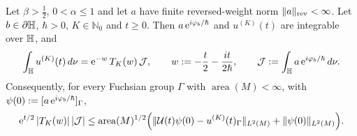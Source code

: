 \begin{proposition}\label{prop:mean}
Let $\beta>\tfrac12$, $0<\alpha\le1$ and let $a$ have finite reversed-weight norm $\lVert a\rVert_{\mathrm{rev}}<\infty$.
Let $b\in\partial\mathbb{H}$, $\hbar>0$, $K\in\mathbb N_0$ and $t\ge0$. Then $a\,\mathrm{e}^{i\varphi_b/\hbar}$ and $u^{(K)}(t)$ are integrable
over $\mathbb{H}$, and
\[
  \int_{\mathbb{H}}u^{(K)}(t)\,d\nu=\mathrm{e}^{-w}\,T_K(w)\,\mathcal J,\qquad w:=-\frac t2-\frac{it}{2\hbar},\qquad
  \mathcal J:=\int_{\mathbb{H}}a\,\mathrm{e}^{i\varphi_b/\hbar}\,d\nu .
\]
Consequently, for every Fuchsian group $\Gamma$ with $\operatorname{area}(M)<\infty$, with $\psi(0):=[a\,\mathrm{e}^{i\varphi_b/\hbar}]_\Gamma$,
\[
  \mathrm{e}^{t/2}\,|T_K(w)|\,|\mathcal J|\le\operatorname{area}(M)^{1/2}\Bigl(\lVert \mathcal{U}(t)\psi(0)-u^{(K)}(t)_\Gamma\rVert_{L^2(M)}+\lVert \psi(0)\rVert_{L^2(M)}\Bigr).
\]
\end{proposition}
